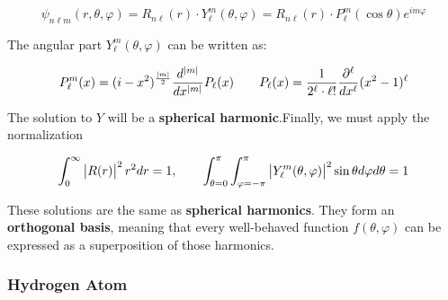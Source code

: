 \documentclass{article}
\begin{document}
\begin{comment}
To use the Schrödinger equation, we must define the Laplacian operator $\nabla^2$:
$$\nabla^2 = \frac{1}{r^2} \pdif{}{r} \left(r^2 \pdif{}{r}\right) + \frac{1}{r^2 \sin\theta} \pdif{}{\theta} \left(\sin\theta \pdif{}{\theta}\right) + \frac{1}{r^2 \sin^2\theta} \pdiff{}{\varphi}$$

Now, we insert this into the Schrödinger equation and try to separate the radial part $R(r)$ from the angular part $Y(\theta, \varphi)$. By introducing a separation constant $\ell(\ell+1)$, we get:

$$\psi(r,\theta, \varphi) = R(r) \cdot Y(\theta, \varphi)$$
{\small $$\frac1R \pdif{}{r} \left(r^2 \pdif{R}{r}\right) - \frac{2mr^2}{\hslash^2} (V-E) = - \left( \frac{1}{Y \sin \theta} \pdif{}{\theta} \left( \sin \theta \pdif{Y}{\theta} \right) + \frac{1}{\sin^2 \theta} \pdiff{Y}{\varphi} \right) =\ell(\ell+1)$$}

The angular equation can be rewritten, in order to separate $Y(\theta, \varphi)$ into $\Theta(\theta)\Phi(\varphi)$. With this separation, we get for the angular part:
$$\Phi(2\pi) = \Phi(0) \; \rightarrow \; m \in \mathbb{Z}, \quad \abs{m} \leq \ell$$
\end{comment}

$$\psi_{n \ell m}(r,\theta,\varphi) = R_{n \ell}(r) \cdot Y_\ell^m (\theta, \varphi) = R_{n\ell}(r) \cdot P_\ell^m(\cos \theta) e^{i m \varphi}$$

The angular part $Y_\ell^m(\theta, \varphi)$ can be written as:

$$P_\ell^m(x) = (i-x^2)^{\frac{\left| m \right|}{2}} \frac{d^{\left| m \right|}}{dx^{\left| m \right|}} P_\ell(x) \qquad P_\ell(x) = \frac{1}{2^\ell \cdot \ell!} \frac{\partial^\ell}{dx^\ell} (x^2-1)^\ell$$

The solution to $Y$ will be a \textbf{spherical harmonic}.Finally, we must apply the normalization

$$\int_0^\infty \left| R(r) \right|^2 r^2 dr = 1, \qquad \int_{\theta=0}^{\pi} \int_{\varphi=-\pi}^{\pi} \left| Y_\ell^m(\theta,\varphi) \right|^2 \sin \theta d\varphi d\theta = 1$$

These solutions are the same as \textbf{spherical harmonics}. 
They form an \textbf{orthogonal basis}, meaning that every well-behaved function $f(\theta, \varphi)$ can be expressed as a superposition of those harmonics.

\subsubsection{Hydrogen Atom}
\end{document}
